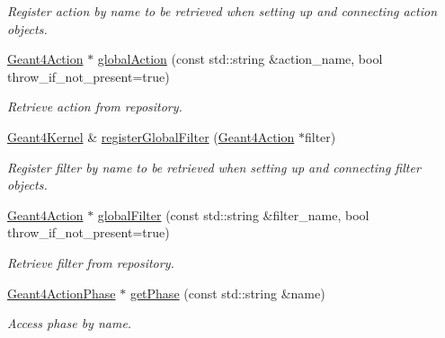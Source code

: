 \begin{DoxyCompactItemize}
\begin{DoxyCompactList}\small\item\em Register action by name to be retrieved when setting up and connecting action objects. \item\end{DoxyCompactList}\item 
\hyperlink{class_d_d4hep_1_1_simulation_1_1_geant4_action}{Geant4Action} $\ast$ \hyperlink{class_d_d4hep_1_1_simulation_1_1_geant4_kernel_a9142233acf94a391ef926eee86b04c26}{globalAction} (const std::string \&action\_\-name, bool throw\_\-if\_\-not\_\-present=true)
\begin{DoxyCompactList}\small\item\em Retrieve action from repository. \item\end{DoxyCompactList}\item 
\hyperlink{class_d_d4hep_1_1_simulation_1_1_geant4_kernel}{Geant4Kernel} \& \hyperlink{class_d_d4hep_1_1_simulation_1_1_geant4_kernel_a0690ca4b44a14133f0c8562eebac9613}{registerGlobalFilter} (\hyperlink{class_d_d4hep_1_1_simulation_1_1_geant4_action}{Geant4Action} $\ast$filter)
\begin{DoxyCompactList}\small\item\em Register filter by name to be retrieved when setting up and connecting filter objects. \item\end{DoxyCompactList}\item 
\hyperlink{class_d_d4hep_1_1_simulation_1_1_geant4_action}{Geant4Action} $\ast$ \hyperlink{class_d_d4hep_1_1_simulation_1_1_geant4_kernel_ad6b6f410f168992639e4fe3fa9fc2c73}{globalFilter} (const std::string \&filter\_\-name, bool throw\_\-if\_\-not\_\-present=true)
\begin{DoxyCompactList}\small\item\em Retrieve filter from repository. \item\end{DoxyCompactList}\item 
\hyperlink{class_d_d4hep_1_1_simulation_1_1_geant4_action_phase}{Geant4ActionPhase} $\ast$ \hyperlink{class_d_d4hep_1_1_simulation_1_1_geant4_kernel_ada608fd803fba670ab573da9a7a012eb}{getPhase} (const std::string \&name)
\begin{DoxyCompactList}\small\item\em Access phase by name. \item\end{DoxyCompactList}\item 

\end{DoxyCompactItemize}
